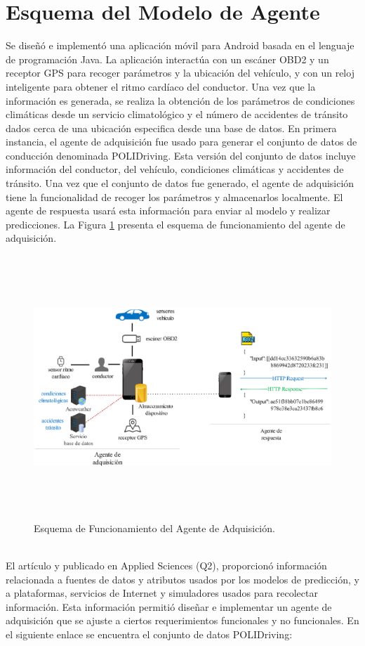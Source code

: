 \documentclass[a4paper,10pt, oneside, titlepage]{article}
\begin{document}
	\section{Esquema del Modelo de Agente}\label{Modelo_Agente}
	Se diseñó e implementó una aplicación móvil para Android basada en el lenguaje de programación Java. La aplicación interactúa con un escáner OBD2 y un receptor GPS para recoger parámetros y la ubicación del vehículo, y con un reloj inteligente para obtener el ritmo cardíaco del conductor. Una vez que la información es generada, se realiza la obtención de los parámetros de condiciones climáticas desde un servicio climatológico y el número de accidentes de tránsito dados cerca de una ubicación especifica desde una base de datos. En primera instancia, el agente de adquisición fue usado para generar el conjunto de datos de conducción denominada POLIDriving. Esta versión del conjunto de datos incluye información del conductor, del vehículo, condiciones climáticas y accidentes de tránsito. Una vez que el conjunto de datos fue generado, el agente de adquisición tiene la funcionalidad de recoger los parámetros y almacenarlos localmente. El agente de respuesta usará esta información para enviar al modelo y realizar predicciones. La Figura \ref{Esquema} presenta el esquema de funcionamiento del agente de adquisición.
	\begin{figure}[!h]
		\centering
		\includegraphics[width = 1\linewidth, height = 9.9cm]{Esquema.png}
		\caption{Esquema de Funcionamiento del Agente de Adquisición.}
		\label{Esquema}
	\end{figure} \\
	\indent El artículo \cite{marcillo2022systematic} y publicado en Applied Sciences (Q2), proporcionó información relacionada a fuentes de datos y atributos usados por los modelos de predicción, y a plataformas, servicios de Internet y simuladores usados para recolectar información. Esta información permitió diseñar e implementar un agente de adquisición que se ajuste a ciertos requerimientos funcionales y no funcionales. En el siguiente enlace se encuentra el conjunto de datos POLIDriving:
\end{document}

